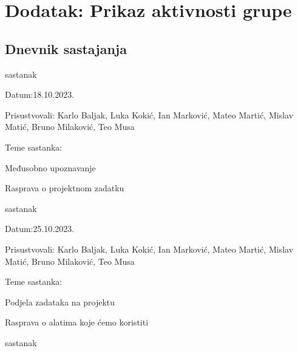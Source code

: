 \chapter*{Dodatak: Prikaz aktivnosti grupe}
		
		\section*{Dnevnik sastajanja}
		
		\begin{packed_enum}
			\item  sastanak
			
			\item[] \begin{packed_item}
				\item Datum:18.10.2023.
				\item Prisustvovali: Karlo Baljak, Luka Kokić, Ian Marković, Mateo Martić, Mislav Matić, Bruno Milaković, Teo Musa
				\item Teme sastanka:
				\begin{packed_item}
					\item  Međusobno upoznavanje
					\item  Rasprava o projektnom zadatku
				\end{packed_item}
			\end{packed_item}
			
			\item  sastanak
			
			\item[] \begin{packed_item}
				\item Datum:25.10.2023.
				\item Prisustvovali: Karlo Baljak, Luka Kokić, Ian Marković, Mateo Martić, Mislav Matić, Bruno Milaković, Teo Musa
				\item Teme sastanka:
				\begin{packed_item}
					\item  Podjela zadataka na projektu
					\item  Rasprava o alatima koje ćemo koristiti
				\end{packed_item}
			\end{packed_item}
			
			\item  sastanak
			

\end{packed_enum}
